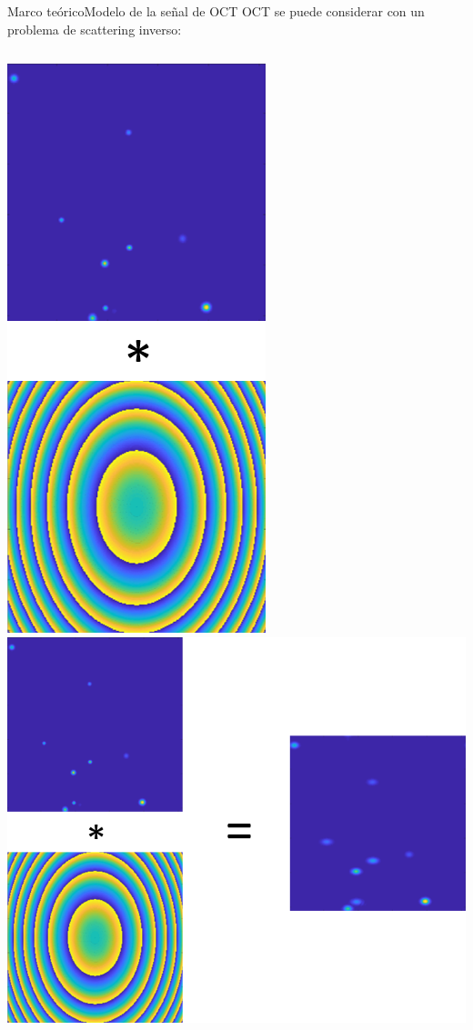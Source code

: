 \documentclass[fleqn,10pt,aspectratio=169,dvipsnames]{beamer}
\begin{document}
\begin{frame}[t]{Marco teórico}{Modelo de la señal de OCT}
OCT se puede considerar con un problema de scattering inverso:
\vspace{\baselineskip}
	\begin{columns}
		\begin{column}{.4\textwidth}
			\begin{center}
				\begin{overprint}
\includegraphics[height=.5\textheight]{Figuras/Theory_ConvModel_1.png}
\includegraphics[height=.5\textheight]{Figuras/Theory_ConvModel_2.png}

\end{overprint}
\end{center}
\end{column}
\end{columns}
\end{frame}
\end{document}

